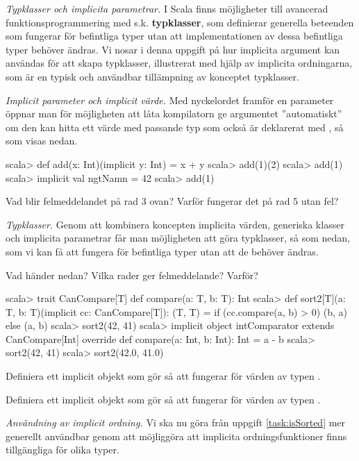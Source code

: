 \AdvancedTasks %

\Task \emph{Typklasser och implicita parametrar.} I Scala finns möjligheter till avancerad funktionsprogrammering med s.k. \textbf{typklasser}, som definierar generella beteenden som fungerar för befintliga typer utan att implementationen av dessa befintliga typer behöver ändras. Vi nosar i denna uppgift på hur implicita argument kan användas för att skapa typklasser, illustrerat med hjälp av implicita ordningarna, som är en typisk och användbar tillämpning av konceptet typklasser. 

\Subtask \emph{Implicit parameter och implicit värde.} Med nyckelordet  framför en parameter öppnar man för möjligheten att låta kompilatorn ge argumentet ''automatiskt'' om den kan hitta ett värde med passande typ som också är deklarerat med , så som visas nedan. 
\begin{REPL}
scala> def add(x: Int)(implicit y: Int) = x + y
scala> add(1)(2)
scala> add(1)
scala> implicit val ngtNamn = 42   
scala> add(1)
\end{REPL}
Vad blir felmeddelandet på rad 3 ovan? Varför fungerar det på rad 5 utan fel?

\Subtask \emph{Typklasser.} Genom att kombinera koncepten implicita värden, generiska klasser och implicita parametrar får man möjligheten att göra typklasser, så som  nedan, som vi kan få att fungera för befintliga typer utan att de behöver ändras. 

Vad händer nedan? Vilka rader ger felmeddelande? Varför? 

\begin{REPL}
scala> trait CanCompare[T] { def compare(a: T, b: T): Int }
scala> def sort2[T](a: T, b: T)(implicit cc: CanCompare[T]): (T, T) = 
         if (cc.compare(a, b) > 0) (b, a) else (a, b)  
scala> sort2(42, 41)
scala> implicit object intComparator extends CanCompare[Int]{
         override def compare(a: Int, b: Int): Int = a - b
       } 
scala> sort2(42, 41)
scala> sort2(42.0, 41.0)
\end{REPL}

\Subtask Definiera ett implicit objekt som gör så att  fungerar för värden av typen .

\Subtask Definiera ett implicit objekt som gör så att  fungerar för värden av typen .


\Task \label{task:implicit-ordering}\emph{Användning av implicit ordning.} Vi ska nu göra  från uppgift \ref{task:isSorted} mer generellt användbar genom att möjliggöra att implicita ordningsfunktioner finns tillgängliga för olika typer.

